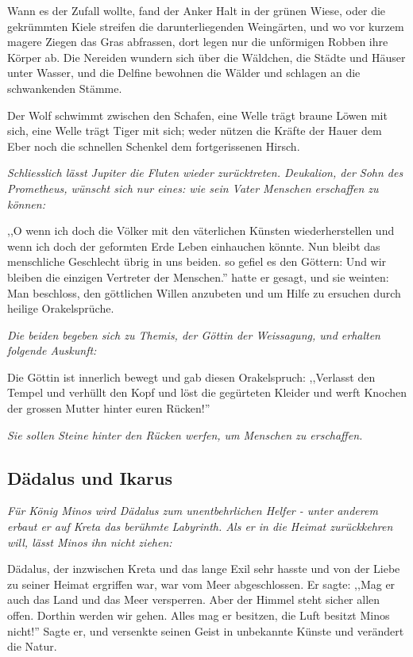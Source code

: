\documentclass[a4paper]{article}
\begin{document}
Wann es der Zufall wollte, fand der Anker Halt in der grünen Wiese, oder die gekrümmten Kiele streifen die darunterliegenden Weingärten, und wo vor kurzem magere Ziegen das Gras abfrassen, dort legen nur die unförmigen Robben ihre Körper ab. Die Nereiden wundern sich über die Wäldchen, die Städte und Häuser unter Wasser, und die Delfine bewohnen die Wälder und schlagen an die schwankenden Stämme. 

Der Wolf schwimmt zwischen den Schafen, eine Welle trägt braune Löwen mit sich, eine Welle trägt Tiger mit sich; weder nützen die Kräfte der Hauer dem Eber noch die schnellen Schenkel dem fortgerissenen Hirsch. 

\textit{Schliesslich lässt Jupiter die Fluten wieder zurücktreten. Deukalion, der Sohn des Prometheus, wünscht sich nur eines: wie sein Vater Menschen erschaffen zu können:}

,,O wenn ich doch die Völker mit den väterlichen Künsten wiederherstellen und wenn ich doch der geformten Erde Leben einhauchen könnte. Nun bleibt das menschliche Geschlecht übrig in uns beiden. so gefiel es den Göttern: Und wir bleiben die einzigen Vertreter der Menschen.'' hatte er gesagt, und sie weinten: Man beschloss, den göttlichen Willen anzubeten und um Hilfe zu ersuchen durch heilige Orakelsprüche. 

\textit{Die beiden begeben sich zu Themis, der Göttin der Weissagung, und erhalten folgende Auskunft:}

Die Göttin ist innerlich bewegt und gab diesen Orakelspruch: ,,Verlasst den Tempel und verhüllt den Kopf und löst die gegürteten Kleider und werft Knochen der grossen Mutter hinter euren Rücken!''

\textit{Sie sollen Steine hinter den Rücken werfen, um Menschen zu erschaffen. }
\subsection{Dädalus und Ikarus}
\textit{Für König Minos wird Dädalus zum unentbehrlichen Helfer - unter anderem erbaut er auf Kreta das berühmte Labyrinth. Als er in die Heimat zurückkehren will, lässt Minos ihn nicht ziehen: }

Dädalus, der inzwischen Kreta und das lange Exil sehr hasste und von der Liebe zu seiner Heimat ergriffen war, war vom Meer abgeschlossen. Er sagte: ,,Mag er auch das Land und das Meer versperren. Aber der Himmel steht sicher allen offen. Dorthin werden wir gehen. Alles mag er besitzen, die Luft besitzt Minos nicht!'' Sagte er, und versenkte seinen Geist in unbekannte Künste und verändert die Natur. 
\end{document}
